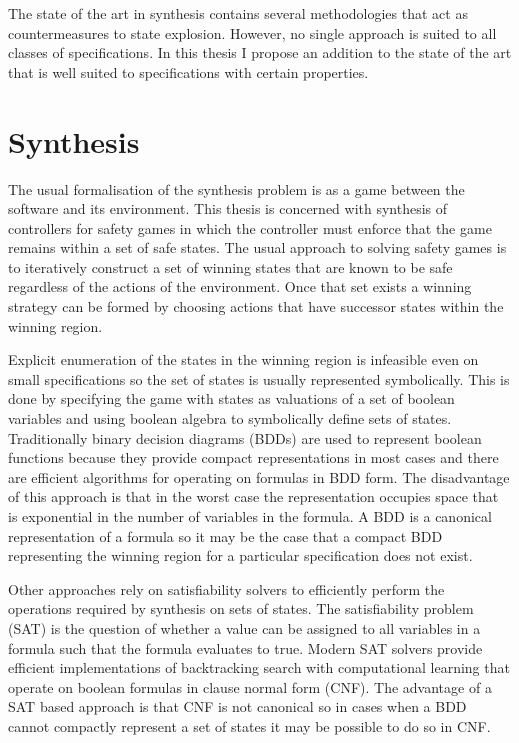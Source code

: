 The state of the art in synthesis contains several methodologies that act as countermeasures to state explosion. However, no single approach is suited to all classes of specifications. In this thesis I propose an addition to the state of the art that is well suited to specifications with certain properties.

\section{Synthesis}

The usual formalisation of the synthesis problem is as a game between the software and its environment. This thesis is concerned with synthesis of controllers for safety games in which the controller must enforce that the game remains within a set of safe states. The usual approach to solving safety games is to iteratively construct a set of winning states that are known to be safe regardless of the actions of the environment. Once that set exists a winning strategy can be formed by choosing actions that have successor states within the winning region.

Explicit enumeration of the states in the winning region is infeasible even on small specifications so the set of states is usually represented symbolically. This is done by specifying the game with states as valuations of a set of boolean variables and using boolean algebra to symbolically define sets of states. Traditionally binary decision diagrams (BDDs) are used to represent boolean functions because they provide compact representations in most cases and there are efficient algorithms for operating on formulas in BDD form. The disadvantage of this approach is that in the worst case the representation occupies space that is exponential in the number of variables in the formula. A BDD is a canonical representation of a formula so it may be the case that a compact BDD representing the winning region for a particular specification does not exist.

Other approaches rely on satisfiability solvers to efficiently perform the operations required by synthesis on sets of states. The satisfiability problem (SAT) is the question of whether a value can be assigned to all variables in a formula such that the formula evaluates to true. Modern SAT solvers provide efficient implementations of backtracking search with computational learning that operate on boolean formulas in clause normal form (CNF). The advantage of a SAT based approach is that CNF is not canonical so in cases when a BDD cannot compactly represent a set of states it may be possible to do so in CNF.

